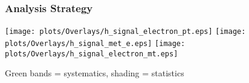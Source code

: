 \begin{frame}
	\frametitle{Analysis Strategy}

	\vspace{10pt}
	
	
	
	
	\vspace{20pt}
		\texttt{[image: plots/Overlays/h\_signal\_electron\_pt.eps]}
		\texttt{[image: plots/Overlays/h\_signal\_met\_e.eps]}
		\texttt{[image: plots/Overlays/h\_signal\_electron\_mt.eps]}
	\cend
	\vspace{-10pt}
	\begin{center}
		{\scriptsize{Green bands = systematics, shading = statistics}}
	\end{center}
	
	
 	\vspace{-20pt}
 	
		
\end{frame}